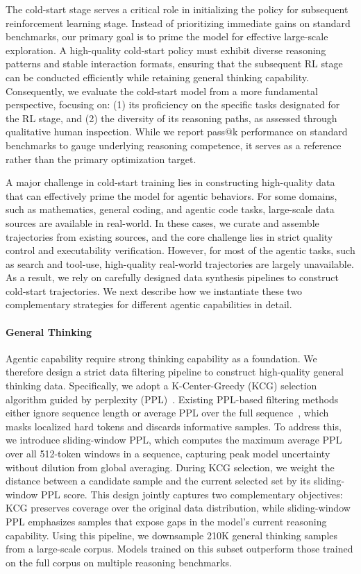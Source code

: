 \documentclass{article}
\begin{document}
The cold-start stage serves a critical role in initializing the policy for subsequent reinforcement learning stage.
Instead of prioritizing immediate gains on standard benchmarks, our primary goal is to prime the model for effective large-scale exploration.
A high-quality cold-start policy must exhibit diverse reasoning patterns and stable interaction formats, ensuring that the subsequent RL stage can be conducted efficiently while retaining general thinking capability.
Consequently, we evaluate the cold-start model from a more fundamental perspective, focusing on: (1) its proficiency on the specific tasks designated for the RL stage, and (2) the diversity of its reasoning paths, as assessed through qualitative human inspection.
While we report pass@k performance on standard benchmarks to gauge underlying reasoning competence, it serves as a reference rather than the primary optimization target.

A major challenge in cold-start training lies in constructing high-quality data that can effectively prime the model for agentic behaviors.
For some domains, such as mathematics, general coding, and agentic code tasks, large-scale data sources are available in real-world.
In these cases, we curate and assemble trajectories from existing sources, and the core challenge lies in strict quality control and executability verification.
However, for most of the agentic tasks, such as search and tool-use, high-quality real-world trajectories are largely unavailable.
As a result, we rely on carefully designed data synthesis pipelines to construct cold-start trajectories.
We next describe how we instantiate these two complementary strategies for different agentic capabilities in detail.

\paragraph{General Thinking}
Agentic capability require strong thinking capability as a foundation.
We therefore design a strict data filtering pipeline to construct high-quality general thinking data.
Specifically, we adopt a K-Center-Greedy (KCG) selection algorithm guided by perplexity (PPL)~\citep{KCG1, KCG2, KCG3}.
Existing PPL-based filtering methods either ignore sequence length or average PPL over the full sequence~\citep{PPL1, PPL2}, which masks localized hard tokens and discards informative samples.
To address this, we introduce sliding-window PPL, which computes the maximum average PPL over all 512-token windows in a sequence, capturing peak model uncertainty without dilution from global averaging.
During KCG selection, we weight the distance between a candidate sample and the current selected set by its sliding-window PPL score.
This design jointly captures two complementary objectives: KCG preserves coverage over the original data distribution, while sliding-window PPL emphasizes samples that expose gaps in the model’s current reasoning capability.
Using this pipeline, we downsample 210K general thinking samples from a large-scale corpus.
Models trained on this subset outperform those trained on the full corpus on multiple reasoning benchmarks.
\end{document}
